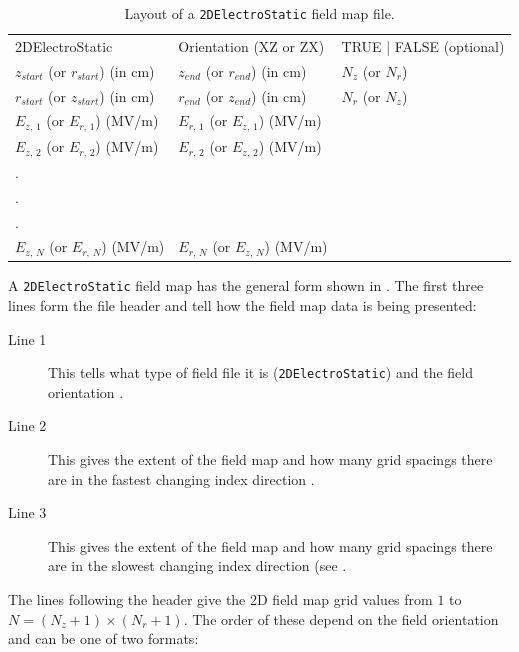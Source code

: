 \begin{table}[ht!]
    \caption{Layout of a \texttt{2DElectroStatic} field map file.}
    \label{tab:2DElectroStatic}
    \begin{center}
    \begin{tabular}{lll}
      \hline
      2DElectroStatic & Orientation (XZ or ZX) & TRUE | FALSE (optional) \\
      $z_{start}$ (or $r_{start}$) (in cm) & $z_{end}$ (or $r_{end}$) (in cm) & $N_{z}$ (or $N_{r}$) \\
      $r_{start}$ (or $z_{start}$) (in cm) & $r_{end}$ (or $z_{end}$) (in cm) & $N_{r}$ (or $N_{z}$) \\
      $E_{z,\,1}$ (or $E_{r,\,1}$) (MV/m) & $E_{r,\,1}$ (or $E_{z,\,1}$) (MV/m)& \\
      $E_{z,\,2}$ (or $E_{r,\,2}$) (MV/m) & $E_{r,\,2}$ (or $E_{z,\,2}$) (MV/m)& \\
      . & & \\
      . & & \\
      . & & \\
      $E_{z,\,N}$ (or $E_{r,\,N}$) (MV/m) & $E_{r,\,N}$ (or $E_{z,\,N}$) (MV/m)& \\
      \hline
    \end{tabular}
    \end{center}
\end{table}

A \texttt{2DElectroStatic} field map has the general form shown in . The first three lines form
the file header and tell \opalt how the field map data is being presented:

\begin{description}
\item[Line 1] This tells \opalt what type of field file it is (\texttt{2DElectroStatic}) and the field orientation
  .
\item[Line 2] This gives the extent of the field map and how many grid spacings there are in the fastest changing
  index direction .
\item[Line 3] This gives the extent of the field map and how many grid spacings there are in the slowest changing
  index direction (see .
\end{description}

The lines following the header give the 2D field map grid values from $1$ to $N = (N_{z} + 1) \times (N_{r} + 1)$.
The order of these depend on the field orientation  and can be one of two formats:

